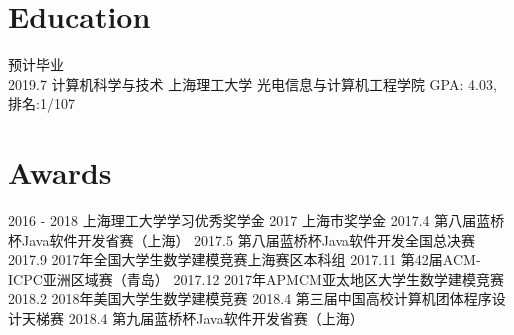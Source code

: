 \documentclass[letterpaper,UTF8]{twentysecondcv} %
\begin{document}
\makeprofile %

\section{Education}

\begin{twenty} %
	\twentyitem
    	{预计毕业 \\ 2019.7}
        {计算机科学与技术}
        {}
        {上海理工大学 光电信息与计算机工程学院}
        {GPA: 4.03, 排名:1/107}
\end{twenty}


\section{Awards}
\begin{twenty}
	\twentyitem
    	{2016 - 2018}
        {上海理工大学学习优秀奖学金}
        {\textbf{{}}}
        {}
        {}
    \twentyitem
        {2017}
        {上海市奖学金}
        {\textbf{{}}}
        {}
        {}
    \twentyitem
        {2017.4}
        {第八届蓝桥杯Java软件开发省赛（上海）}
        {\textbf{{}}}
        {}
        {}
    \twentyitem
        {2017.5}
        {第八届蓝桥杯Java软件开发全国总决赛}
        {\textbf{{}}}
        {}
        {}
    \twentyitem
        {2017.9}
        {2017年全国大学生数学建模竞赛上海赛区本科组}
        {\textbf{{}}}
        {}
        {}
    \twentyitem
        {2017.11}
        {第42届ACM-ICPC亚洲区域赛（青岛）}
        {\textbf{{}}}
        {}
        {}
    \twentyitem
        {2017.12}
        {2017年APMCM亚太地区大学生数学建模竞赛}
        {\textbf{{}}}
        {}
        {}
    \twentyitem
        {2018.2}
        {2018年美国大学生数学建模竞赛}
        {\textbf{{}}}
        {}
        {}
    \twentyitem
        {2018.4}
        {第三届中国高校计算机团体程序设计天梯赛}
        {\textbf{{}}}
        {}
        {}
    \twentyitem
        {2018.4}
        {第九届蓝桥杯Java软件开发省赛（上海）}
        {\textbf{{}}}
        {}
        {}
\end{twenty}
\end{document}
